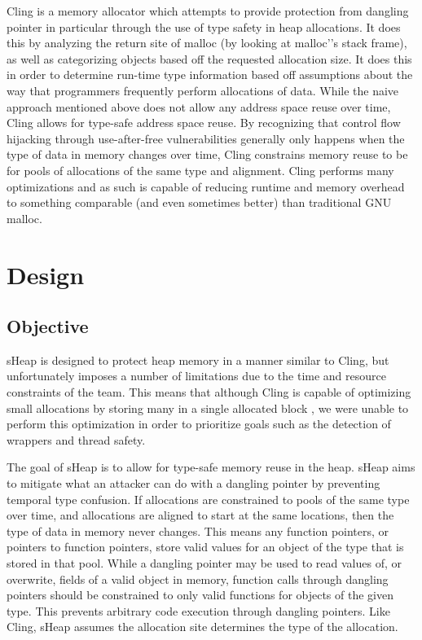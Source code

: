 \documentclass[conference]{IEEEtran}
\begin{document}
Cling \cite{b1} is a memory allocator which attempts to provide protection 
from dangling pointer in particular through the use of type safety in heap 
allocations. It does this by analyzing the return site of malloc (by looking 
at malloc'’s stack frame), as well as categorizing objects based off the requested allocation size. 
It does this in order to determine run-time type information based off 
assumptions about the way that programmers frequently perform allocations of data. While the naive approach mentioned above does not allow any address space reuse over time, Cling allows for type-safe address space reuse.  By recognizing that control flow hijacking through use-after-free vulnerabilities generally only happens when the type of data in memory changes over time, Cling constrains memory reuse to be for pools of allocations of the same type and alignment. Cling performs many optimizations and as such is capable of 
reducing runtime and memory overhead to something comparable (and even 
sometimes better) than traditional GNU malloc. 

\section{Design}

\subsection{Objective}
sHeap is designed to protect heap memory in a manner similar to Cling, but 
unfortunately imposes a number of limitations due to the time and resource 
constraints of the team. This means that although Cling is capable of 
optimizing small allocations by storing many in a single allocated block 
\cite{b1}, we were unable to perform this optimization in order to 
prioritize goals such as the detection of wrappers and thread safety.

The goal of sHeap is to allow for type-safe memory reuse in the heap. sHeap aims to mitigate what an attacker can do with a dangling pointer by preventing temporal type confusion.  If allocations are constrained to pools of the same type over time, and allocations are aligned to start at the same locations, then the type of data in memory never changes.  This means any function pointers, or pointers to function pointers, store valid values for an object of the type that is stored in that pool.  While a dangling pointer may be used to read values of, or overwrite, fields of a valid object in memory, function calls through dangling pointers should be constrained to only valid functions for objects of the given type.  This prevents arbitrary code execution through dangling pointers. Like Cling, sHeap assumes the allocation site determines the type of the allocation. 
\end{document}
